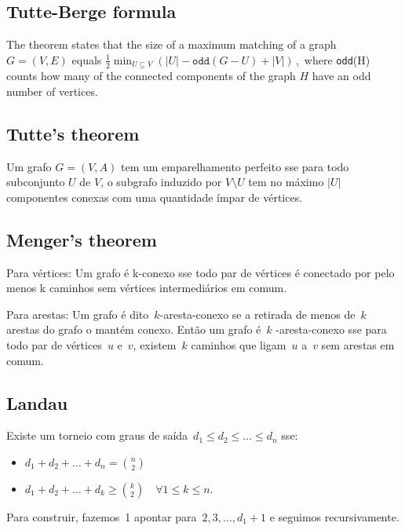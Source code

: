 \iffalse %
\subsection{Fecho de Peso Máximo}
Dado um digrafo $G$ com peso nos vértices. Transforme $G$ numa rede de fluxo, colocando o peso de cada aresta como $\infty$. Adicione vértices $S,T$. Para cada vértice $v$ de peso $w$, adicione uma aresta $(S, v, w)$ se $w\geq 0$, ou a aresta $(v,T,-w)$ se $w<0$. A soma de todos os pesos positivos menos o corte mínimo $c(S,T)$ é a resposta. Vértices que são alcançados a partir de $S$ estão no fecho. O fecho de peso máximo é o mesmo que o complemento do fecho de peso mínimo num grafo com as arestas invertidas.
\fi


\subsection{Tutte-Berge formula}
The theorem states that the size of a maximum matching of a graph $G=(V,E)$ equals ${\frac {1}{2}}\min _{U\subseteq V}\left(|U|- \texttt{odd}(G-U)+|V|\right)\,,$ where \texttt{odd}(H) counts how many of the connected components of the graph $H$ have an odd number of vertices.

\subsection{Tutte's theorem}
Um grafo $G = (V, A)$ tem um emparelhamento perfeito sse para todo subconjunto $U$ de $V$, o subgrafo induzido por $V \setminus U$ tem no máximo $|U|$ componentes conexas com uma quantidade ímpar de vértices.

\subsection{Menger's theorem}
\item Para vértices:
Um grafo é k-conexo sse todo par de vértices é conectado por pelo menos k caminhos sem vértices intermediários em comum.
\item Para arestas:
Um grafo é dito~$k$-aresta-conexo se a retirada de menos de~$k$ arestas do grafo o mantém conexo. Então um grafo é~$k$ -aresta-conexo sse para todo par de vértices~$u$ e~$v$, existem~$k$ caminhos que ligam~$u$ a~$v$ sem arestas em comum.

\subsection{Landau}
Existe um torneio com graus de saída~$d_1 \leq d_2 \leq \ldots \leq d_n$ sse:
\begin{itemize}
\item $d_1 + d_2 + \ldots + d_n = {n \choose 2}$\newline
\item $d_1 + d_2 + \ldots + d_k \geq {k \choose 2} \quad \forall 1 \leq k \leq n.$
\end{itemize}
Para construir, fazemos~1 apontar para~$2, 3, \ldots, d_1 + 1$ e seguimos recursivamente.

